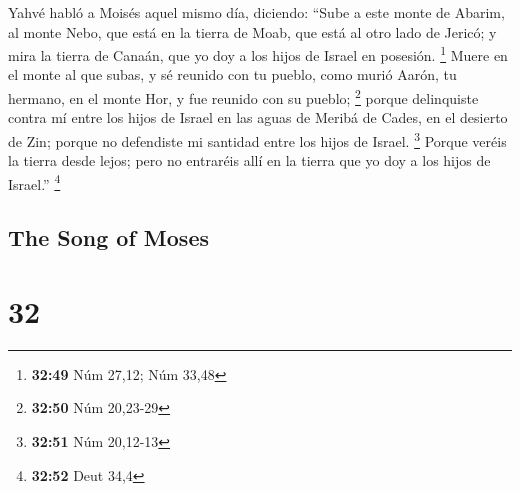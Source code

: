 \begin{paracol}{2}
 Yahvé habló a Moisés aquel mismo día, diciendo:
 ``Sube a este monte de Abarim, al monte Nebo, que está
en la tierra de Moab, que está al otro lado de Jericó; y mira la tierra
de Canaán, que yo doy a los hijos de Israel en posesión. \footnote{\textbf{32:49}
  Núm 27,12; Núm 33,48}  Muere en el monte al que subas,
y sé reunido con tu pueblo, como murió Aarón, tu hermano, en el monte
Hor, y fue reunido con su pueblo; \footnote{\textbf{32:50} Núm 20,23-29}
 porque delinquiste contra mí entre los hijos de Israel
en las aguas de Meribá de Cades, en el desierto de Zin; porque no
defendiste mi santidad entre los hijos de Israel. \footnote{\textbf{32:51}
  Núm 20,12-13}  Porque veréis la tierra desde lejos;
pero no entraréis allí en la tierra que yo doy a los hijos de Israel.''
\footnote{\textbf{32:52} Deut 34,4}

\switchcolumn
\begin{otherlanguage}{english}

\hypertarget{the-song-of-moses}{%
\subsection{The Song of Moses}\label{the-song-of-moses}}

\hypertarget{section-63}{%
\section{32}\label{section-63}}


\end{otherlanguage}
\end{paracol}

